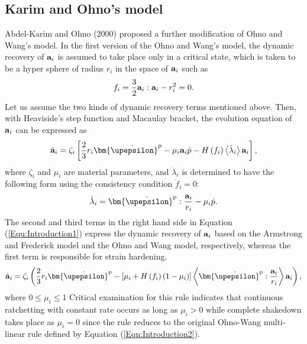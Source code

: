 \subsection{Karim and Ohno's model}
\noindent
Abdel-Karim and Ohno (2000) \cite{Abdel2000} proposed a further modification of Ohno and Wang's model.
In the first version of the Ohno and Wang's model, the dynamic recovery of ${{\bf{a}}_i}$ is assumed to take place only in a critical state, which is taken to be a hyper sphere of radius $r_i$ in the space of ${{\bf{a}}_i}$ such as
\begin{equation}
{f_i} = \frac{3}{2}{{\bf{a}}_i}:{{\bf{a}}_i} - r_i^2 = 0.
\end{equation}
Let us assume the two kinds of dynamic recovery terms mentioned above. Then, with Heaviside's step function and Macaulay bracket, the evolution equation of ${{\bf{a}}_i}$ can be expressed as
\begin{equation}
{{\dot{\bf a}}_i} = {\zeta _i}\left[ {\frac{2}{3}{r_i}{{{\bm{\dot \upepsilon }}}^{\rm{p}}} - {\mu _i}{{\bf{a}}_i}\dot p - H\left( {{f_i}} \right)\left\langle {{{\dot \lambda }_i}} \right\rangle {{\bf{a}}_i}} \right],
\label{Equ:Introduction1}
\end{equation}
where $\zeta_i$ and $\mu_i$ are material parameters, and ${\dot \lambda }_i$ is determined to have the following form using the consistency condition ${\dot f_i} = 0$:
\begin{equation}
{\dot \lambda _i} = {\bm{\dot \upepsilon }}^{\rm{p}}:\frac{{{{\bf{a}}_i}}}{{{r_i}}} - {\mu _i}\dot p.
\end{equation}
The second and third terms in the right hand side in Equation (\ref{Equ:Introduction1}) express the dynamic recovery of ${\bf{a}}_i$ based on the Armstrong and Frederick model and the Ohno and Wang model, respectively, whereas the first term is responsible for strain hardening.
\begin{equation}
{{\dot{\bf a}}_i} = {\zeta _i}\left( {\frac{2}{3}{r_i}{{{\bm{\dot \upepsilon }}}^{\rm{p}}} - \left[ {{\mu _i} + H\left( {{f_i}} \right)\left( {1 - {\mu _i}} \right)} \right]\left\langle {{{{\bm{\dot \upepsilon }}}^{\rm{p}}}:\frac{{{{\bf{a}}_i}}}{{{r_i}}}} \right\rangle {{\bf{a}}_i}} \right),
\end{equation}
where $0 \le {\mu _i} \le 1$ Critical examination for this rule indicates that continuous ratchetting with constant rate occurs as long as ${\mu _i} > 0$ while complete shakedown takes place as ${\mu _i} = 0$ since the rule reduces to the original Ohno-Wang multi-linear rule defined by Equation (\ref{Eqn:Introduction2}).

